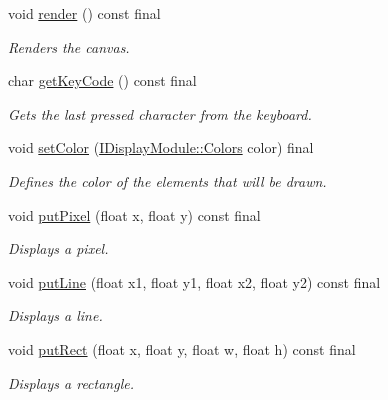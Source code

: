 \begin{DoxyCompactItemize}
\mbox{\label{classArcade_1_1Display_1_1Ncurses_a6dfbb6d91614db8ae92fd28c5f9bf663}} 
void \mbox{\hyperlink{classArcade_1_1Display_1_1Ncurses_a6dfbb6d91614db8ae92fd28c5f9bf663}{render}} () const final
\begin{DoxyCompactList}\small\item\em Renders the canvas. \end{DoxyCompactList}\item 
char \mbox{\hyperlink{classArcade_1_1Display_1_1Ncurses_a250dbb0610f79a7524ba5a926be750b6}{get\+Key\+Code}} () const final
\begin{DoxyCompactList}\small\item\em Gets the last pressed character from the keyboard. \end{DoxyCompactList}\item 
void \mbox{\hyperlink{classArcade_1_1Display_1_1Ncurses_a2b9c5de7068fcf6c85b0201d5de0fade}{set\+Color}} (\mbox{\hyperlink{classArcade_1_1Display_1_1IDisplayModule_ae0a776be9163d096051c522e21c007b2}{I\+Display\+Module\+::\+Colors}} color) final
\begin{DoxyCompactList}\small\item\em Defines the color of the elements that will be drawn. \end{DoxyCompactList}\item 
void \mbox{\hyperlink{classArcade_1_1Display_1_1Ncurses_a78be67c84498f97a781906f17f3e5f61}{put\+Pixel}} (float x, float y) const final
\begin{DoxyCompactList}\small\item\em Displays a pixel. \end{DoxyCompactList}\item 
void \mbox{\hyperlink{classArcade_1_1Display_1_1Ncurses_aaa099fcaa46df8d8d984547933664d7e}{put\+Line}} (float x1, float y1, float x2, float y2) const final
\begin{DoxyCompactList}\small\item\em Displays a line. \end{DoxyCompactList}\item 
void \mbox{\hyperlink{classArcade_1_1Display_1_1Ncurses_a602741b15ebd421fccd915fea036cb0f}{put\+Rect}} (float x, float y, float w, float h) const final
\begin{DoxyCompactList}\small\item\em Displays a rectangle. \end{DoxyCompactList}\item 

\end{DoxyCompactItemize}
